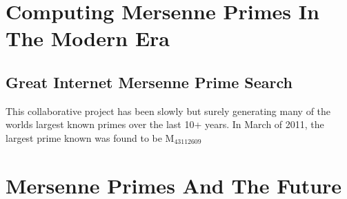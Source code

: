 \section{Computing Mersenne Primes In The Modern Era}
\subsection{Great Internet Mersenne Prime Search}
This collaborative project has been slowly but surely generating many of the worlds largest known primes over the last 10+ years.  In March of 2011, the largest prime known was found to be M$_{43112609}$
\section{Mersenne Primes And The Future}
